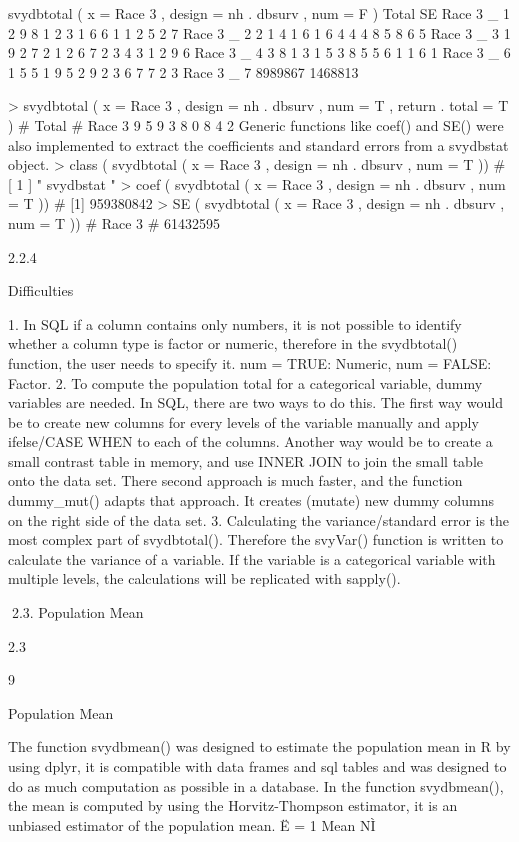 svydbtotal ( x = Race 3 , design = nh . dbsurv , num = F )
Total
SE
Race 3 _ 1 2 9 8 1 2 3 1 6 6 1 1 2 5 2 7
Race 3 _ 2 2 1 4 1 6 1 6 4 4 4 8 5 8 6 5
Race 3 _ 3 1 9 2 7 2 1 2 6 7 2 3 4 3 1 2 9 6
Race 3 _ 4 3 8 1 3 1 5 3 8 5 5 6 1 1 6 1
Race 3 _ 6 1 5 5 1 9 5 2 9 2 3 6 7 7 2 3
Race 3 _ 7
8989867 1468813

> svydbtotal ( x = Race 3 , design = nh . dbsurv , num = T ,
return . total = T )
#
Total
# Race 3 9 5 9 3 8 0 8 4 2
Generic functions like coef() and SE() were also implemented to extract the
coefficients and standard errors from a svydbstat object.
> class ( svydbtotal ( x = Race 3 , design = nh . dbsurv , num = T ))
# [ 1 ] " svydbstat "
> coef ( svydbtotal ( x = Race 3 , design = nh . dbsurv , num = T ))
# [1] 959380842
> SE ( svydbtotal ( x = Race 3 , design = nh . dbsurv , num = T ))
#
Race 3
# 61432595

2.2.4

Difficulties

1. In SQL if a column contains only numbers, it is not possible to identify whether
a column type is factor or numeric, therefore in the svydbtotal() function, the
user needs to specify it. num = TRUE: Numeric, num = FALSE: Factor.
2. To compute the population total for a categorical variable, dummy variables
are needed. In SQL, there are two ways to do this. The first way would be
to create new columns for every levels of the variable manually and apply
ifelse/CASE WHEN to each of the columns. Another way would be to create
a small contrast table in memory, and use INNER JOIN to join the small table
onto the data set. There second approach is much faster, and the function
dummy_mut() adapts that approach. It creates (mutate) new dummy columns
on the right side of the data set.
3. Calculating the variance/standard error is the most complex part of svydbtotal().
Therefore the svyVar() function is written to calculate the variance of a variable. If the variable is a categorical variable with multiple levels, the calculations will be replicated with sapply().

2.3. Population Mean

2.3

9

Population Mean

The function svydbmean() was designed to estimate the population mean in R by
using dplyr, it is compatible with data frames and sql tables and was designed to do
as much computation as possible in a database.
In the function svydbmean(), the mean is computed by using the Horvitz-Thompson
estimator, it is an unbiased estimator of the population mean.
Ë = 1
Mean
NÌ

